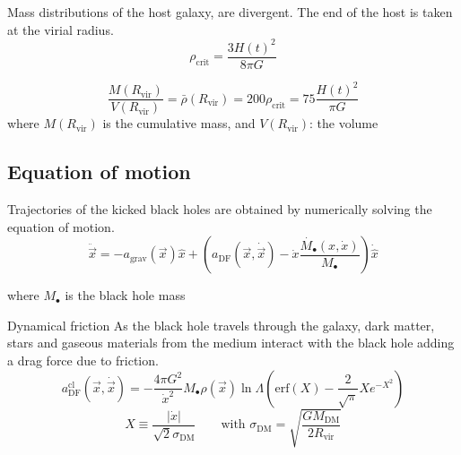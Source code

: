 \documentclass{beamer}
\newcommand{\erf}[1]{\text{erf}\left(#1\right)}
\begin{document}
\begin{frame}
	Mass distributions of the host galaxy, are divergent. The end of the host is taken at the virial radius.
	\begin{equation}\label{eq: critical_density}
		\rho_\text{crit} = \dfrac{3H(t)^2}{8\pi G}
	\end{equation}
	
	\begin{equation}\label{eq: R_vir_def}
		\dfrac{M(R_\text{vir})}{V(R_\text{vir})} = \bar{\rho}(R_\text{vir}) =  200 \rho_\text{crit} = 75\dfrac{H(t)^2}{\pi G}
	\end{equation}
	where $M(R_\text{vir})$ is the cumulative mass, and $V(R_\text{vir})$: the volume
\end{frame}

\subsection{Equation of motion}
\begin{frame}{}
Trajectories of the kicked black holes are obtained by numerically solving the equation of motion.
\begin{equation}\label{eq: equationMotion}
	\ddot{\vec{x}} = -a_\text{grav}(\vec{x})\hat{x} + \left(a_\text{DF}(\vec{x}, \dot{\vec{x}})-\dot{x}\dfrac{\dot{M_\bullet}(x, \dot{x})}{M_\bullet}\right)\dot{\hat{x}} 
\end{equation}

where $M_\bullet$ is the black hole mass
\end{frame}

\begin{frame}{Dynamical friction}
	As the black hole travels through the galaxy, dark matter, stars and gaseous materials from the medium interact with the black hole adding a drag force due to friction. 
	\begin{equation}\label{eq: df_cl}
		a_\text{DF}^\text{cl}(\vec{x}, \dot{\vec{x}}) = -\dfrac{4\pi G^2}{\dot{x}^2} M_\bullet\rho(\vec{x})\ln\Lambda\left(\erf{X} - \dfrac{2}{\sqrt{\pi}}Xe^{-X^2}\right)
	\end{equation}
	\begin{equation}
	X \equiv \dfrac{|\dot{x}|}{\sqrt{2}\sigma_\text{DM}} \qquad \text{with } \sigma_\text{DM} = \sqrt{\dfrac{GM_\text{DM}}{2R_\text{vir}}}
	\end{equation}
\end{frame}
\end{document}
